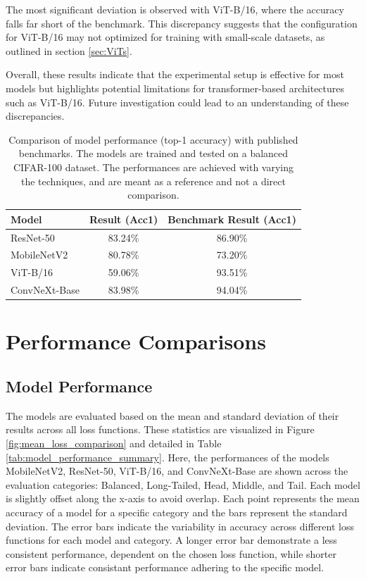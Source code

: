 The most significant deviation is observed with ViT-B/16, where the accuracy falls far short of the benchmark. This discrepancy suggests that the configuration for ViT-B/16 may not optimized for training with small-scale datasets, as outlined in section \ref{sec:ViTs}. 

Overall, these results indicate that the experimental setup is effective for most models but highlights potential limitations for transformer-based architectures such as ViT-B/16. Future investigation could lead to an understanding of these discrepancies.

\begin{table}[H]
    \centering
    \caption{Comparison of model performance (top-1 accuracy) with published benchmarks. The models are trained and tested on a balanced CIFAR-100 dataset. The performances are achieved with varying the techniques, and are meant as a reference and not a direct comparison.}
    \small
    \begin{tabular}{lcc}
    \toprule
    \textbf{Model}        & \textbf{Result (Acc1)} & \textbf{Benchmark Result (Acc1)}  \\ 
    \midrule
    ResNet-50            & 83.24\%               & 86.90\% \cite{wightman2021resnetstrikesbackimproved}  \\ 
    MobileNetV2           & 80.78\%               & 73.20\% \cite{park2022bitatneuralnetworkbinarization}  \\ 
    ViT-B/16              & 59.06\%               & 93.51\% \cite{ye2023partialfinetuningsuccessorfinetuning} \\ 
    ConvNeXt-Base         & 83.98\%               & 94.04\% \cite{ye2023partialfinetuningsuccessorfinetuning}  \\ 
    \bottomrule
    \end{tabular}
    \label{tab:benchmark_comparison}
\end{table}



\section{Performance Comparisons}
\subsection{Model Performance}
The models are evaluated based on the mean and standard deviation of their results across all loss functions. These statistics are visualized in Figure \ref{fig:mean_loss_comparison} and detailed in Table \ref{tab:model_performance_summary}. Here, the performances of the models MobileNetV2, ResNet-50, ViT-B/16, and ConvNeXt-Base are shown across the evaluation categories: Balanced, Long-Tailed, Head, Middle, and Tail. Each model is slightly offset along the x-axis to avoid overlap. Each point represents the mean accuracy of a model for a specific category and the bars represent the standard deviation. The error bars indicate the variability in accuracy across different loss functions for each model and category. A longer error bar demonstrate a less consistent performance, dependent on the chosen loss function, while shorter error bars indicate consistant performance adhering to the specific model.


